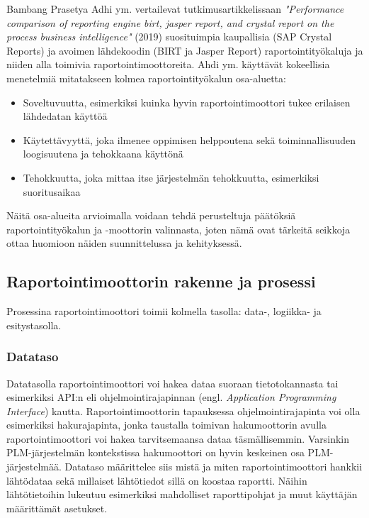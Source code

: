 Bambang Prasetya Adhi ym. vertailevat tutkimusartikkelissaan \textit{"Performance comparison of reporting engine birt, jasper report, and crystal report on the process business intelligence"} (2019)  \cite{adhi_performance_2019} suosituimpia kaupallisia (SAP Crystal Reports) ja avoimen lähdekoodin (BIRT ja Jasper Report) raportointityökaluja ja niiden alla toimivia raportointimoottoreita. Ahdi ym. käyttävät kokeellisia menetelmiä mitatakseen kolmea raportointityökalun osa-aluetta:
\begin{itemize}
\item Soveltuvuutta, esimerkiksi kuinka hyvin raportointimoottori tukee erilaisen lähdedatan käyttöä
\item Käytettävyyttä, joka ilmenee oppimisen helppoutena sekä toiminnallisuuden loogisuutena ja tehokkaana käyttönä
\item Tehokkuutta, joka mittaa itse järjestelmän tehokkuutta, esimerkiksi suoritusaikaa
\end{itemize}
Näitä osa-alueita arvioimalla voidaan tehdä perusteltuja päätöksiä raportointityökalun ja -moottorin valinnasta, joten nämä ovat tärkeitä seikkoja ottaa huomioon näiden suunnittelussa ja kehityksessä.

\subsection{Raportointimoottorin rakenne ja prosessi} \label{Raportointimoottorin rakenne ja prosessi}

Prosessina raportointimoottori toimii kolmella tasolla: data-, logiikka- ja esitystasolla. \cite{he_design_2010}

\subsubsection{Datataso}

Datatasolla raportointimoottori voi hakea dataa suoraan tietotokannasta tai esimerkiksi API:n eli ohjelmointirajapinnan (engl. \textit{Application Programming Interface}) kautta. Raportointimoottorin tapauksessa ohjelmointirajapinta voi olla esimerkiksi hakurajapinta, jonka taustalla toimivan hakumoottorin avulla raportointimoottori voi hakea tarvitsemaansa dataa täsmällisemmin. Varsinkin PLM-järjestelmän kontekstissa hakumoottori on hyvin keskeinen osa PLM-järjestelmää. Datataso määrittelee siis mistä ja miten raportointimoottori hankkii lähtödataa sekä millaiset lähtötiedot sillä on koostaa raportti. \cite{he_design_2010} Näihin lähtötietoihin lukeutuu esimerkiksi mahdolliset raporttipohjat ja muut käyttäjän määrittämät asetukset.

